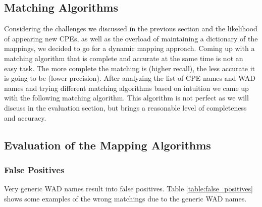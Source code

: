 {{\subsection{Matching Algorithms}


Considering the challenges we discussed in the previous section and the likelihood of appearing new CPEs, as well as the overload of maintaining a dictionary of the mappings, we decided to go for a dynamic mapping approach. 
Coming up with a matching algorithm that is complete and accurate at the same time is not an easy task. The more complete the matching is (higher recall), the less accurate it is going to be (lower precision). After analyzing the list of CPE names and WAD names and trying different matching algorithms based on intuition we came up with the following matching algorithm. This algorithm is not perfect as we will discuss in the evaluation section, but brings a reasonable level of completeness and accuracy. 


 
\subsection{Evaluation of the Mapping Algorithms}

\subsubsection{False Positives}
Very generic WAD names result into false positives. Table \ref{table:false_positives} shows some examples of the wrong matchings due to the generic WAD names. 
\begin{table}
\begin{center}
    \begin{tabular}{ | c | c | }
    

\end{tabular}
\end{center}
\end{table}}}

